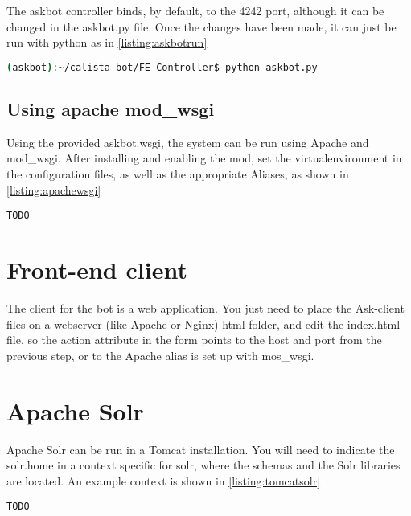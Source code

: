 The askbot controller binds, by default, to the 4242 port, although it can be changed in the askbot.py file. Once the changes have been made, it can just be run with python as in \ref{listing:askbotrun}
\begin{center} 
  \begin{lstlisting}[language=bash, captionpos=b, caption=Running the front end controller, label=listing:askbotrun]
  (askbot):~/calista-bot/FE-Controller$ python askbot.py
  \end{lstlisting}
\end{center}

\subsection{Using apache mod\_wsgi}

Using the provided askbot.wsgi, the system can be run using Apache and mod\_wsgi. After installing and enabling the mod, set the virtualenvironment in the configuration files, as well as the appropriate Aliases, as shown in \ref{listing:apachewsgi}
\begin{center} 
  \begin{lstlisting}[language={}, captionpos=b, caption=Apache WSGI configuration, label=listing:apachewsgi]
  TODO
  \end{lstlisting}
\end{center}

\section{Front-end client}

The client for the bot is a web application. You just need to place the Ask-client files on a webserver (like Apache or Nginx) html folder, and edit the index.html file, so the action attribute in the form points to the host and port from the previous step, or to the Apache alias is set up with mos\_wsgi.

\section{Apache Solr}

Apache Solr can be run in a Tomcat installation. You will need to indicate the solr.home in a context specific for solr, where the schemas and the Solr libraries are located. An example context is shown in \ref{listing:tomcatsolr}

\begin{center} 
  \begin{lstlisting}[language={}, captionpos=b, caption=Tomcat context for solr, label=listing:tomcatsolr]
  TODO
  \end{lstlisting}
\end{center}
